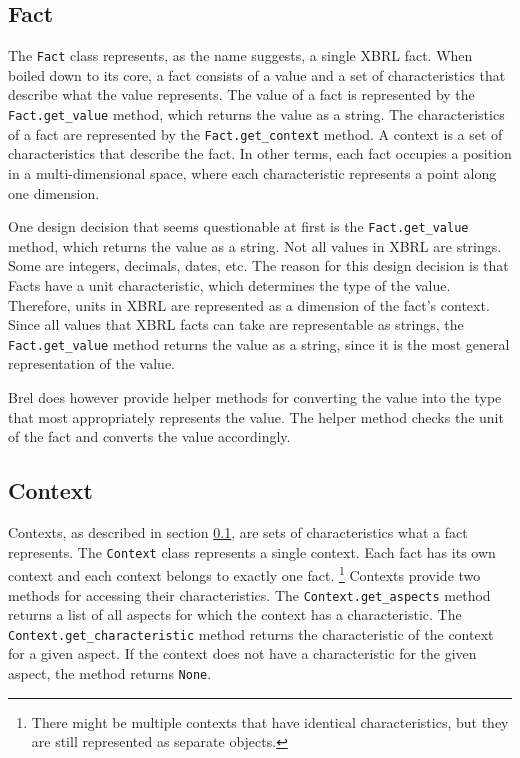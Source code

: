 \subsection{Fact}
\label{subsec:fact}

The \texttt{Fact} class represents, as the name suggests, a single XBRL fact.
When boiled down to its core, a fact consists of a value and a set of characteristics that describe what the value represents.
The value of a fact is represented by the \texttt{Fact.get\_value} method, which returns the value as a string.
The characteristics of a fact are represented by the \texttt{Fact.get\_context} method.
A context is a set of characteristics that describe the fact.
In other terms, each fact occupies a position in a multi-dimensional space, where each characteristic represents a point along one dimension.

One design decision that seems questionable at first is the \texttt{Fact.get\_value} method, which returns the value as a string.
Not all values in XBRL are strings.
Some are integers, decimals, dates, etc.
The reason for this design decision is that Facts have a unit characteristic, which determines the type of the value.
Therefore, units in XBRL are represented as a dimension of the fact's context.
Since all values that XBRL facts can take are representable as strings, the \texttt{Fact.get\_value} method returns the value as a string,
since it is the most general representation of the value.

Brel does however provide helper methods for converting the value into the type that most appropriately represents the value.
The helper method checks the unit of the fact and converts the value accordingly.

\subsection{Context}

Contexts, as described in section \ref{subsec:fact}, are sets of characteristics what a fact represents.
The \texttt{Context} class represents a single context.
Each fact has its own context and each context belongs to exactly one fact.
\footnote{There might be multiple contexts that have identical characteristics, but they are still represented as separate objects.}
Contexts provide two methods for accessing their characteristics.
The \texttt{Context.get\_aspects} method returns a list of all aspects for which the context has a characteristic.
The \texttt{Context.get\_characteristic} method returns the characteristic of the context for a given aspect.
If the context does not have a characteristic for the given aspect, the method returns \texttt{None}.

